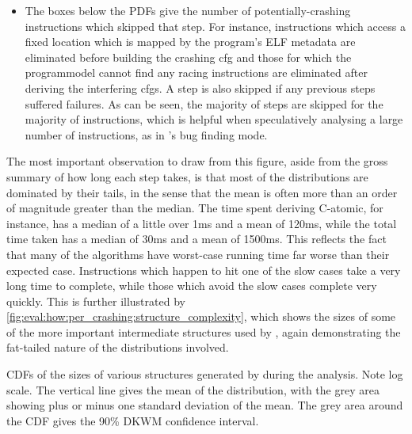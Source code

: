 \begin{itemize}
  across the figure.  In this case, nine instructions reached the five
  minute timeout during {\StateMachine} simplification, one reached
  the timeout while deriving the interfering \glspl{cfg}, and three
  instructions ran out of memory while deriving the interfering
  \glspl{cfg}.  Note that the timeout runs from the start of the
  ``build crashing \gls{cfg}'' step, rather than from the start of the
  current step.
\item The boxes below the PDFs give the number of potentially-crashing
  instructions which skipped that step.  For instance, instructions
  which access a fixed location which is mapped by the program's ELF
  metadata are eliminated before building the crashing \gls{cfg} and
  those for which the \gls{programmodel} cannot find any racing
  instructions are eliminated after deriving the interfering
  \glspl{cfg}.  A step is also skipped if any previous steps suffered
  failures.  As can be seen, the majority of steps are skipped for the
  majority of instructions, which is helpful when speculatively
  analysing a large number of instructions, as in {\technique}'s bug
  finding mode.
\end{itemize}
The most important observation to draw from this figure, aside from
the gross summary of how long each step takes, is that most of the
distributions are dominated by their tails, in the sense that the mean
is often more than an order of magnitude greater than the median.  The
time spent deriving C-atomic, for instance, has a median of a little
over 1ms and a mean of 120ms, while the total time taken has a median
of 30ms and a mean of 1500ms.  This reflects the fact that many of the
algorithms have worst-case running time far worse than their expected
case.  Instructions which happen to hit one of the slow cases take a
very long time to complete, while those which avoid the slow cases
complete very quickly.  This is further illustrated by
\autoref{fig:eval:how:per_crashing:structure_complexity}, which shows
the sizes of some of the more important intermediate structures used
by {\technique}, again demonstrating the fat-tailed nature of the
distributions involved.

\begin{sanefig}
  \centerline{
  }
  \caption{CDFs of the sizes of various structures generated by
    {\technique} during the analysis.  Note log scale.  The vertical
    line gives the mean of the distribution, with the grey area
    showing plus or minus one standard deviation of the mean.  The
    grey area around the CDF gives the 90\% DKWM confidence
    interval. \label{fig:eval:how:per_crashing:structure_complexity}}
\end{sanefig}

